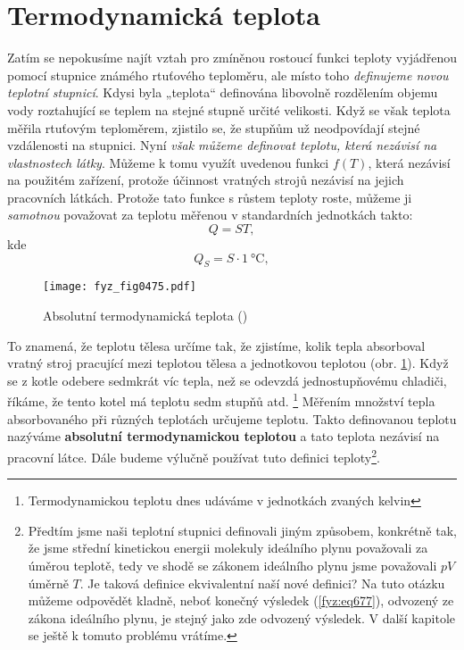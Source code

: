   \section{Termodynamická teplota}\label{fyz:IchapXLIVsecV}
    Zatím se nepokusíme najít vztah pro zmíněnou rostoucí funkci teploty vyjádřenou pomocí stupnice
    známého rtuťového teploměru, ale místo toho \emph{deﬁnujeme novou teplotní stupnicí}. Kdysi byla
    „teplota“ deﬁnována libovolně rozdělením objemu vody roztahující se teplem na stejné stupně
    určité velikosti. Když se však teplota měřila rtuťovým teploměrem, zjistilo se, že stupňům už
    neodpovídají stejné vzdálenosti na stupnici. Nyní \emph{však můžeme deﬁnovat teplotu, která
    nezávisí na vlastnostech látky}. Můžeme k tomu využít uvedenou funkci \(f(T)\), která nezávisí
    na použitém zařízení, protože účinnost vratných strojů nezávisí na jejich pracovních látkách.
    Protože tato funkce s růstem teploty roste, můžeme ji \emph{samotnou} považovat za teplotu
    měřenou v standardních jednotkách takto:
    \begin{equation}\label{fyz:eq691}
      Q=ST,
    \end{equation}
    kde
    \begin{equation}\label{fyz:eq692}
      Q_S=S\cdot\SI{1}{\celsius},
    \end{equation}

    \begin{figure}[ht!] %
      \centering
      \texttt{[image: fyz\_fig0475.pdf]}
      \caption{Absolutní termodynamická teplota (\cite[s.~707]{Feynman01})}
      \label{fyz:fig0475}
    \end{figure}

    To znamená, že teplotu tělesa určíme tak, že zjistíme, kolik tepla absorboval vratný stroj
    pracující mezi teplotou tělesa a jednotkovou teplotou (obr. \ref{fyz:fig0475}). Když se z kotle
    odebere sedmkrát víc tepla, než se odevzdá jednostupňovému chladiči, říkáme, že tento kotel má
    teplotu sedm stupňů atd. \footnote{Termodynamickou teplotu dnes udáváme v jednotkách zvaných
    kelvin} Měřením množství tepla absorbovaného při různých teplotách určujeme teplotu. Takto
    deﬁnovanou teplotu nazýváme \textbf{absolutní termodynamickou teplotou} a tato teplota nezávisí
    na pracovní látce. Dále budeme výlučně používat tuto deﬁnici teploty\footnote{Předtím jsme naši
    teplotní stupnici definovali jiným způsobem, konkrétně tak, že jsme střední kinetickou energii
    molekuly ideálního plynu považovali za úměrou teplotě, tedy ve shodě se zákonem ideálního plynu
    jsme považovali \(pV\) úměrně \(T\). Je taková definice ekvivalentní naší nové definici? Na tuto
    otázku můžeme odpovědět kladně, neboť konečný výsledek (\ref{fyz:eq677}), odvozený ze zákona
    ideálního plynu, je stejný jako zde odvozený výsledek. V další kapitole se ještě k tomuto
    problému vrátíme.}.

